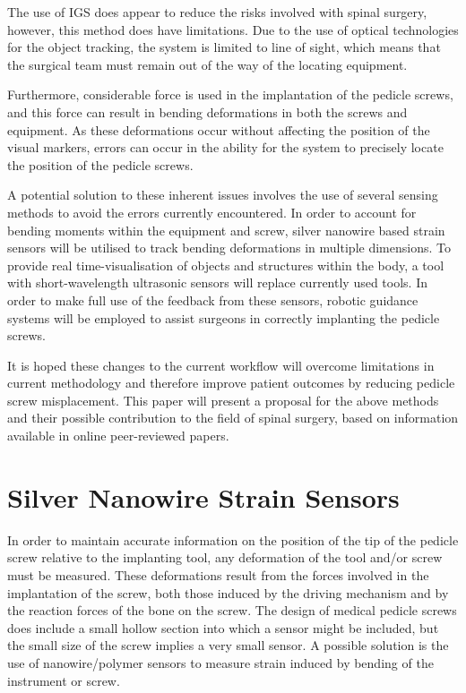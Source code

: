 \documentclass[conference, a4paper]{IEEEtran}
\begin{document}
The use of IGS does appear to reduce the risks involved with spinal surgery, 
however, this method does have limitations. Due to the use of optical technologies for the object tracking, the
system is limited to line of sight, which means that the surgical team must remain out of the way of the locating
equipment. 

Furthermore, considerable force is used in the implantation of the pedicle screws, and this force can
result in bending deformations in both the screws and equipment\cite{Chatzistergos2010}. As these deformations occur without
affecting the position of the visual markers, errors can occur in the ability for the system to precisely locate the
position of the pedicle screws\cite{Castro1996}.


A potential solution to these inherent issues involves the use of several sensing methods to avoid the errors
currently encountered. In order to account for bending moments within the equipment and screw, silver
nanowire based strain sensors will be utilised to track bending deformations in multiple dimensions. To provide
real time-visualisation of objects and structures within the body, a tool with short-wavelength ultrasonic sensors will
replace currently used tools. In order to make full use of the feedback from these sensors, robotic guidance
systems will be employed to assist surgeons in correctly implanting the pedicle screws. 

It is hoped these changes to the current workflow will
overcome limitations in current methodology and therefore improve patient outcomes by reducing pedicle screw
misplacement. This paper will present a proposal for the above methods and their possible contribution to the field
of spinal surgery, based on information available in online peer-reviewed papers.


\section{Silver Nanowire Strain Sensors}


In order to maintain accurate information on the position of the tip of the pedicle screw relative to the
implanting tool, any deformation of the tool and/or screw must be measured. These deformations result from the
forces involved in the implantation of the screw, both those induced by the driving mechanism and by the
reaction forces of the bone on the screw. The design of medical pedicle screws does include a small hollow
section into which a sensor might be included, but the small size of the screw implies a very small sensor. A
possible solution is the use of nanowire/polymer sensors to measure strain induced by bending of the instrument
or screw.
\end{document}
